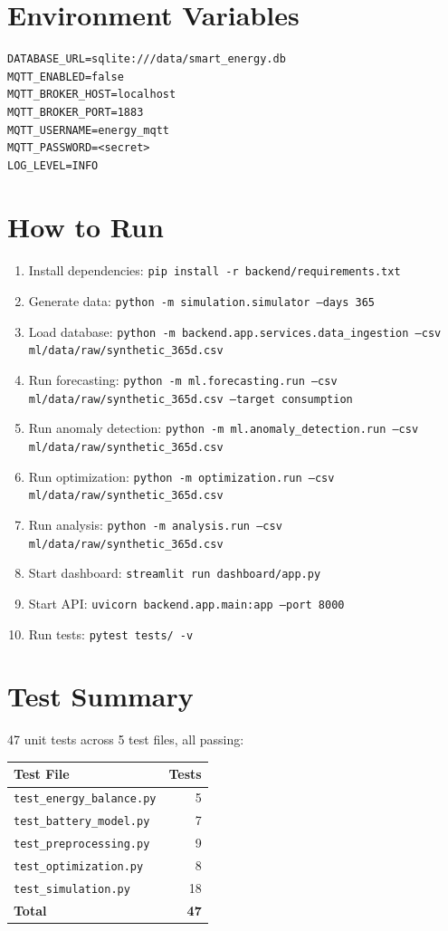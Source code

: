 \section{Environment Variables}

\begin{verbatim}
DATABASE_URL=sqlite:///data/smart_energy.db
MQTT_ENABLED=false
MQTT_BROKER_HOST=localhost
MQTT_BROKER_PORT=1883
MQTT_USERNAME=energy_mqtt
MQTT_PASSWORD=<secret>
LOG_LEVEL=INFO
\end{verbatim}

\section{How to Run}

\begin{enumerate}[nosep]
    \item Install dependencies: \texttt{pip install -r backend/requirements.txt}
    \item Generate data: \texttt{python -m simulation.simulator --days 365}
    \item Load database: \texttt{python -m backend.app.services.data\_ingestion --csv ml/data/raw/synthetic\_365d.csv}
    \item Run forecasting: \texttt{python -m ml.forecasting.run --csv ml/data/raw/synthetic\_365d.csv --target consumption}
    \item Run anomaly detection: \texttt{python -m ml.anomaly\_detection.run --csv ml/data/raw/synthetic\_365d.csv}
    \item Run optimization: \texttt{python -m optimization.run --csv ml/data/raw/synthetic\_365d.csv}
    \item Run analysis: \texttt{python -m analysis.run --csv ml/data/raw/synthetic\_365d.csv}
    \item Start dashboard: \texttt{streamlit run dashboard/app.py}
    \item Start API: \texttt{uvicorn backend.app.main:app --port 8000}
    \item Run tests: \texttt{pytest tests/ -v}
\end{enumerate}

\section{Test Summary}

47 unit tests across 5 test files, all passing:

\begin{table}[H]
\centering
\begin{tabular}{lr}
\toprule
\textbf{Test File} & \textbf{Tests} \\
\midrule
\texttt{test\_energy\_balance.py} & 5 \\
\texttt{test\_battery\_model.py} & 7 \\
\texttt{test\_preprocessing.py} & 9 \\
\texttt{test\_optimization.py} & 8 \\
\texttt{test\_simulation.py} & 18 \\
\midrule
\textbf{Total} & \textbf{47} \\
\bottomrule
\end{tabular}
\end{table}
